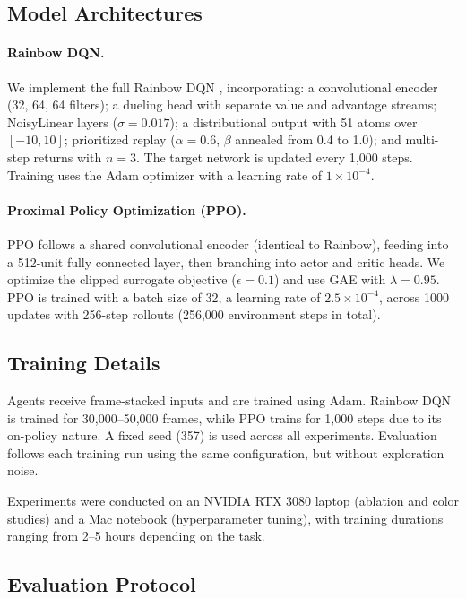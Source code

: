\documentclass{article}
\begin{document}
\subsection{Model Architectures}

\paragraph{Rainbow DQN.} We implement the full Rainbow DQN \cite{hessel2018rainbow}, incorporating:
a convolutional encoder (32, 64, 64 filters); a dueling head with separate value and advantage streams; NoisyLinear layers ($\sigma=0.017$); a distributional output with 51 atoms over $[-10, 10]$; prioritized replay ($\alpha = 0.6$, $\beta$ annealed from 0.4 to 1.0); and multi-step returns with $n = 3$. The target network is updated every 1,000 steps. Training uses the Adam optimizer with a learning rate of $1 \times 10^{-4}$.

\paragraph{Proximal Policy Optimization (PPO).} PPO follows a shared convolutional encoder (identical to Rainbow), feeding into a 512-unit fully connected layer, then branching into actor and critic heads. We optimize the clipped surrogate objective ($\epsilon = 0.1$) and use GAE with $\lambda = 0.95$. PPO is trained with a batch size of 32, a learning rate of $2.5 \times 10^{-4}$, across 1000 updates with 256-step rollouts (256,000 environment steps in total).

\subsection{Training Details}

Agents receive frame-stacked inputs and are trained using Adam. Rainbow DQN is trained for 30,000–50,000 frames, while PPO trains for 1,000 steps due to its on-policy nature. A fixed seed (357) is used across all experiments. Evaluation follows each training run using the same configuration, but without exploration noise.

Experiments were conducted on an NVIDIA RTX 3080 laptop (ablation and color studies) and a Mac notebook (hyperparameter tuning), with training durations ranging from 2–5 hours depending on the task.

\subsection{Evaluation Protocol}
\end{document}
